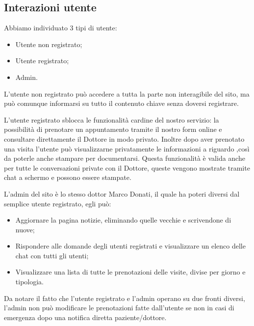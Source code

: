 \subsection{Interazioni utente}

Abbiamo individuato 3 tipi di utente:
\begin{itemize}
\item Utente non registrato;
\item Utente registrato;
\item Admin.
\end{itemize}

L’utente non registrato può accedere a tutta la parte non interagibile del sito, ma può comunque informarsi su tutto il contenuto chiave senza doversi registrare.

L’utente registrato sblocca le funzionalità cardine del nostro servizio: la possibilità di prenotare un appuntamento tramite il nostro form online e consultare direttamente il Dottore in modo privato.
Inoltre dopo aver prenotato una visita l’utente può visualizzarne privatamente le informazioni a riguardo ,così da poterle anche stampare per documentarsi.
Questa funzionalità è valida anche per tutte le conversazioni private con il Dottore, queste vengono mostrate tramite chat a schermo e possono essere stampate.

L’admin del sito è lo stesso dottor Marco Donati, il quale ha poteri diversi dal semplice utente registrato, egli può:

\begin{itemize}
\item Aggiornare la pagina notizie, eliminando quelle vecchie e scrivendone di nuove;
\item Rispondere alle domande degli utenti registrati e visualizzare un elenco delle chat con tutti gli utenti;
\item Visualizzare una lista di tutte le prenotazioni delle visite, divise per giorno e tipologia.
\end{itemize}

Da notare il fatto che l’utente registrato e l’admin operano su due fronti diversi, l’admin non può modificare le prenotazioni fatte dall’utente se non in casi di emergenza dopo una notifica diretta paziente/dottore.